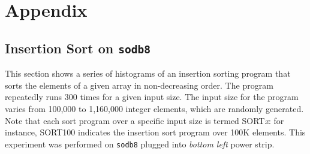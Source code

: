\documentclass[10pt]{article}
\begin{document}
\newpage
\pagebreak

\section{Appendix}

\subsection{Insertion Sort on {\tt sodb8}~\label{sec:add_new}} 
This section shows a series of histograms of an insertion sorting program that 
sorts the elements of a given array in non-decreasing order. 
The program repeatedly runs 300 times for a given input size. 
The input size for the program 
varies from 100,000 to 1,160,000 integer elements, which are randomly generated. 
Note that each sort program over a specific input size is termed SORT{\it x}: 
for instance, SORT100 indicates the insertion sort program over 100K elements. 
This experiment was performed on {\tt sodb8} plugged into {\em bottom left} power strip.
\end{document}
